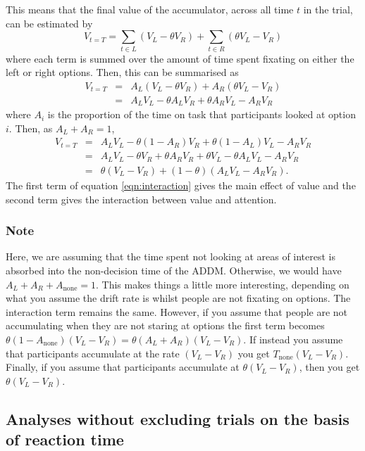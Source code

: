 \documentclass[doc, a4paper, apacite]{apa6}
\begin{document}
 This means that the final value of the accumulator, across all time $t$ in the trial, can be estimated by 
 \begin{equation}
 	V_{t=T} = \sum_{t \in L} \left(V_L - \theta V_R\right) + \sum_{t \in R}	\left(\theta V_L - V_R\right) 
 \end{equation}
 where each term is summed over the amount of time spent fixating on either the left or right options. Then, this can be summarised as 
 \begin{eqnarray}	
 	V_{t=T}&=& A_L\left(V_L -\theta V_R\right) + A_R \left(\theta V_L - V_R \right)\\
 	&=& A_L V_L - \theta A_L V_R + \theta A_R V_L - A_R V_R
 \end{eqnarray}
 where $A_i$ is the proportion of the time on task that participants looked at option $i$. Then, as $A_L + A_R = 1$, 
 \begin{eqnarray}
 	V_{t=T} &=& A_L V_L -\theta(1-A_R)V_R + \theta(1-A_L) V_L - A_R V_R \\
 		  &=& A_L V_L -\theta V_R + \theta A_R V_R + \theta V_L - \theta A_L V_L - A_R V_R \\
 		  &=& \theta(V_L - V_R) + (1-\theta)(A_L V_L - A_R V_R). \label{eqn:interaction}
 \end{eqnarray}
 The first term of equation \ref{eqn:interaction} gives the main effect of value and the second term gives the interaction between value and attention. 
 
\subsubsection{Note}
Here, we are assuming that the time spent not looking at areas of interest is absorbed into the non-decision time of the ADDM. Otherwise, we would have $A_L + A_R + A_\text{none} = 1 $. This makes things a little more interesting, depending on what you assume the drift rate is whilst people are not fixating on options. The interaction term remains the same. However, if you assume that people are not accumulating when they are not staring at options the first term becomes $\theta(1-A_\text{none})(V_L-V_R)=\theta(A_L + A_R)(V_L - V_R)$. If instead you assume that participants accumulate at the rate $(V_L-V_R)$ you get $T_\text{none}(V_L-V_R)$. Finally, if you assume that participants accumulate at $\theta(V_L-V_R)$, then you get $\theta (V_L - V_R)$. 

\subsection{Analyses without excluding trials on the basis of reaction time}
\end{document}
